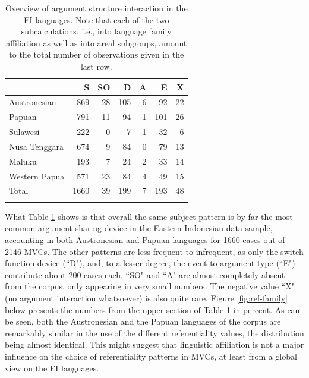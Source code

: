 \begin{table}
\begin{tabular}{lrrrrrr}
  \lsptoprule
 & S & SO & D & A & E & X \tabularnewline 
  \hline
Austronesian & 869 &  28 & 105 &   6 &  92 &  22 \tabularnewline
  Papuan & 791 &  11 & 94 &   1 &  101 &  26 \tabularnewline
  \hline
  Sulawesi & 222 &   0 &  7 &   1 &  32 &   6 \tabularnewline
  Nusa Tenggara & 674 &  9 &  84 &   0 &  79 &  13 \tabularnewline 
  Maluku & 193 &   7 &  24 &   2 &   33 &  14 \tabularnewline
  Western Papua & 571 &  23 & 84 &   4 &  49 &  15 \tabularnewline 
 \hline\hline
 Total & 1660  & 39 & 199 &  7 & 193 &  48 \tabularnewline
   \lspbottomrule
\end{tabular}
\caption[Argument structure interaction in the EI corpus]{Overview of argument structure interaction in the EI languages. Note that each of the two subcalculations, i.e., into language family affiliation as well as into areal subgroups, amount to the total number of observations given in the last row.}
\label{table:Referentiality_overview}
\end{table}

What Table \ref{table:Referentiality_overview} shows is that overall the same subject pattern is by far the most common argument sharing device in the Eastern Indonesian data sample, accounting in both Austronesian and Papuan languages for 1660 cases out of 2146 MVCs. The other patterns are less frequent to infrequent, as only the switch function device (``D"), and, to a lesser degree, the event-to-argument type (``E") contribute about 200 cases each. ``SO" and ``A" are almost completely absent from the corpus, only appearing in very small numbers. The negative value ``X" (no argument interaction whatsoever) is also quite rare. Figure \ref{fig:ref-family} below presents the numbers from the upper section of Table \ref{table:Referentiality_overview} in percent. As can be seen, both the Austronesian and the Papuan languages of the corpus are remarkably similar in the use of the different referentiality values, the distribution being almost identical. This might suggest that linguistic affiliation is not a major influence on the choice of referentiality patterns in MVCs, at least from a global view on the EI languages.

